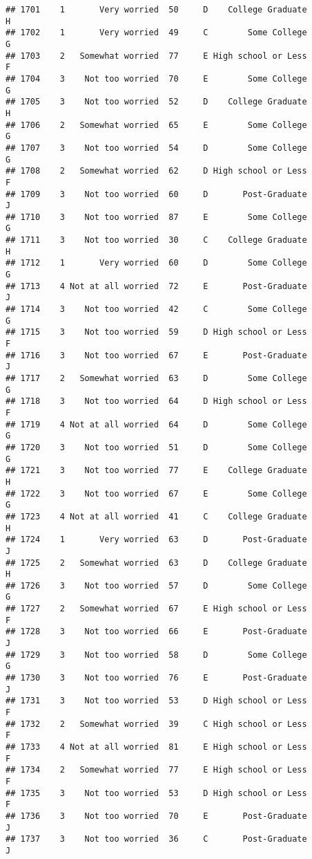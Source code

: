 \documentclass[
]{article}
\begin{document}
\begin{verbatim}
## 1701    1       Very worried  50     D    College Graduate         H
## 1702    1       Very worried  49     C        Some College         G
## 1703    2   Somewhat worried  77     E High school or Less         F
## 1704    3    Not too worried  70     E        Some College         G
## 1705    3    Not too worried  52     D    College Graduate         H
## 1706    2   Somewhat worried  65     E        Some College         G
## 1707    3    Not too worried  54     D        Some College         G
## 1708    2   Somewhat worried  62     D High school or Less         F
## 1709    3    Not too worried  60     D       Post-Graduate         J
## 1710    3    Not too worried  87     E        Some College         G
## 1711    3    Not too worried  30     C    College Graduate         H
## 1712    1       Very worried  60     D        Some College         G
## 1713    4 Not at all worried  72     E       Post-Graduate         J
## 1714    3    Not too worried  42     C        Some College         G
## 1715    3    Not too worried  59     D High school or Less         F
## 1716    3    Not too worried  67     E       Post-Graduate         J
## 1717    2   Somewhat worried  63     D        Some College         G
## 1718    3    Not too worried  64     D High school or Less         F
## 1719    4 Not at all worried  64     D        Some College         G
## 1720    3    Not too worried  51     D        Some College         G
## 1721    3    Not too worried  77     E    College Graduate         H
## 1722    3    Not too worried  67     E        Some College         G
## 1723    4 Not at all worried  41     C    College Graduate         H
## 1724    1       Very worried  63     D       Post-Graduate         J
## 1725    2   Somewhat worried  63     D    College Graduate         H
## 1726    3    Not too worried  57     D        Some College         G
## 1727    2   Somewhat worried  67     E High school or Less         F
## 1728    3    Not too worried  66     E       Post-Graduate         J
## 1729    3    Not too worried  58     D        Some College         G
## 1730    3    Not too worried  76     E       Post-Graduate         J
## 1731    3    Not too worried  53     D High school or Less         F
## 1732    2   Somewhat worried  39     C High school or Less         F
## 1733    4 Not at all worried  81     E High school or Less         F
## 1734    2   Somewhat worried  77     E High school or Less         F
## 1735    3    Not too worried  53     D High school or Less         F
## 1736    3    Not too worried  70     E       Post-Graduate         J
## 1737    3    Not too worried  36     C       Post-Graduate         J

\end{verbatim}
\end{document}
